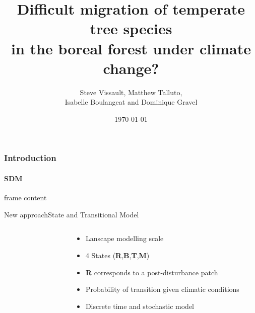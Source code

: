 \documentclass[10pt,aspectratio=149]{beamer}
\author{Steve Vissault, Matthew Talluto, \\
Isabelle Boulangeat and Dominique Gravel}
\title{Difficult migration of temperate tree species \\
in the boreal forest under climate change?}
\date{\today}
\institute{Université du Québec à Rimouski}
\begin{document}
\begin{frame}[plain]
   \titlepage
\end{frame}

\begin{frame}
   \frametitle{Introduction}
   \framesubtitle{SDM}

   frame content
   
\end{frame}


\begin{frame}{New approach}{State and Transitional Model}

\begin{columns}[c]
	\begin{column}[c]{.40\paperwidth}
		\begin{figure}
			\small{}
		\end{figure}
	\end{column}
	\begin{column}[l]{.40\paperwidth}
		\begin{itemize}
			\item Lanscape modelling scale
			\item 4 States (\textbf{R},\textbf{B},\textbf{T},\textbf{M})
			\item \textbf{R} corresponds to a post-disturbance patch
			\item Probability of transition given climatic conditions
			\item Discrete time and stochastic model
		\end{itemize}
	\end{column}
\end{columns}
\end{frame}


\end{document}
